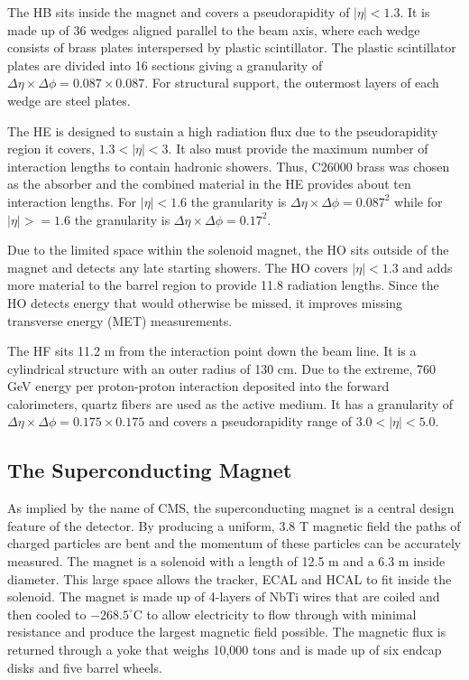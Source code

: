 The HB sits inside the magnet and covers a pseudorapidity of $|\eta| < 1.3$. It is made up of 36 wedges aligned parallel to the beam axis, where each wedge consists of brass plates interspersed by plastic scintillator. The plastic scintillator plates are divided into 16 sections giving a granularity of $\Delta\eta \times \Delta\phi = 0.087 \times 0.087$. For structural support, the outermost layers of each wedge are steel plates.

The HE is designed to sustain a high radiation flux due to the pseudorapidity region it covers, $1.3 < |\eta| < 3$. It also must provide the maximum number of interaction lengths to contain hadronic showers. Thus, C26000 brass was chosen as the absorber and the combined material in the HE provides about ten interaction lengths. For $|\eta| < 1.6$ the granularity is $\Delta\eta \times \Delta\phi = 0.087^{2}$ while for $|\eta| >= 1.6$ the granularity is $\Delta\eta \times \Delta\phi = 0.17^{2}$. 

Due to the limited space within the solenoid magnet, the HO sits outside of the magnet and detects any late starting showers. The HO covers $|\eta| < 1.3$ and adds more material to the barrel region to provide 11.8 radiation lengths. Since the HO detects energy that would otherwise be missed, it improves missing transverse energy (MET) measurements.

 The HF sits 11.2 m from the interaction point down the beam line. It is a cylindrical structure with an outer radius of 130 cm. Due to the extreme, 760 GeV energy per proton-proton interaction deposited into the forward calorimeters, quartz fibers are used as the active medium. It has a granularity of $\Delta\eta \times \Delta\phi = 0.175\times 0.175$ and covers a pseudorapidity range of $3.0 < |\eta| < 5.0$.

\subsection{The Superconducting Magnet}

As implied by the name of CMS, the superconducting magnet is a central design feature of the detector. By producing a uniform, 3.8 T magnetic field the paths of charged particles are bent and the momentum of these particles can be accurately measured. The magnet is a solenoid with a length of 12.5 m and a 6.3 m inside diameter. This large space allows the tracker, ECAL and HCAL to fit inside the solenoid. The magnet is made up of 4-layers of NbTi wires that are coiled and then cooled to $-268.5^{\circ}$C to allow electricity to flow through with minimal resistance and produce the largest magnetic field possible. The magnetic flux is returned through a yoke that weighs 10,000 tons and is made up of six endcap disks and five barrel wheels.

